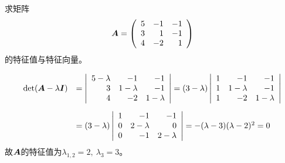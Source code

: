 \begin{frame}
  
    \begin{li}
      求矩阵
      $$
      \boldsymbol{A}=\left(
      \begin{array}{rrr}
        5&-1&-1\\
        3&1&-1\\
        4&-2&1
      \end{array}
      \right)
      $$
      的特征值与特征向量。
    \end{li}\pause 
    
    \begin{jie}
      $$
      \begin{array}{rl}
        \mathrm{det}(\boldsymbol{A}-\lambda\boldsymbol{I})
        &=\left|
          \begin{array}{rrr}
            5-\lambda&-1&-1\\
            3&1-\lambda&-1\\
            4&-2&1-\lambda
          \end{array}
                  \right|
                  = (3-\lambda)
                  \left|\begin{array}{rrr}
                          1&-1&-1\\
                          1&1-\lambda&-1\\
                          1&-2&1-\lambda
                        \end{array}\right|\\[0.3in]
        &= (3-\lambda)
          \left|\begin{array}{rrr}
                  1&-1&-1\\
                  0&2-\lambda&0\\
                  0&-1&2-\lambda
                        \end{array}\right|
                        =-(\lambda-3)(\lambda-2)^2=0
      \end{array}
      $$
      故$\boldsymbol{A}$的特征值为$\lambda_{1,2}=2,~\lambda_3=3$。
    \end{jie}
\end{frame}

